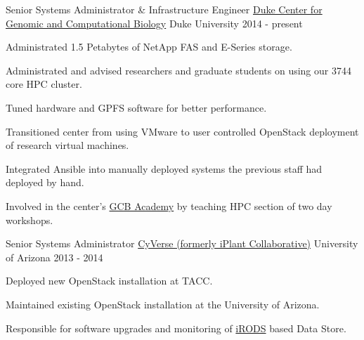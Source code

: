 

\begin{cventries}

  \cventry
    {Senior Systems Administrator \& Infrastructure Engineer} %
    {\href{http://genome.duke.edu}{Duke Center for Genomic and Computational Biology}} %
    {Duke University} %
    {2014 - present} %
    {
      \begin{cvitems} %
        \item {Administrated 1.5 Petabytes of NetApp FAS and E-Series storage.}
        \item {Administrated and advised researchers and graduate students on using our 3744 core HPC cluster.}
        \item {Tuned hardware and GPFS software for better performance.}
        \item {Transitioned center from using VMware to user controlled OpenStack deployment of research virtual machines.}
        \item {Integrated Ansible into manually deployed systems the previous staff had deployed by hand.}
        \item {Involved in the center's \href{http://genome.duke.edu/gcb-academy}{GCB Academy} by teaching HPC section of two day workshops.}
      \end{cvitems}
    }

  \cventry
    {Senior Systems Administrator} %
    {\href{http://cyverse.org/}{CyVerse (formerly iPlant Collaborative)}} %
    {University of Arizona} %
    {2013 - 2014} %
    {
      \begin{cvitems} %
        \item {Deployed new OpenStack installation at TACC.}
        \item {Maintained existing OpenStack installation at the University of Arizona.}
        \item {Responsible for software upgrades and monitoring of \href{http://irods.org/}{iRODS} based Data Store.}
      \end{cvitems}
    }


\end{cventries}
